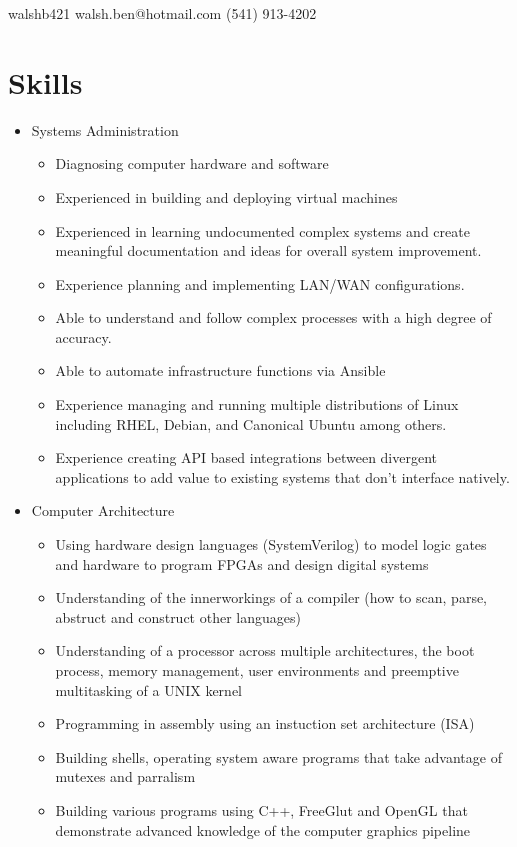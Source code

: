 \documentclass{article}
\begin{document}

	\vspace{0.5cm}

	\noindent
    \faGithub
	\hspace{0.15cm}
	walshb421
	\hfill
	\faEnvelope
	\hspace{0.15cm}
	walsh.ben@hotmail.com	
	\hfill
	\faPhone
	\hspace{0.15cm}
	(541) 913-4202
	
	\section*{Skills}
	\begin{itemize}
		\item Systems Administration
		\begin{itemize}
			\item Diagnosing computer hardware and software
			\item Experienced in building and deploying virtual machines
			\item Experienced in learning undocumented complex systems and create meaningful documentation and ideas for overall system improvement. 
			\item Experience planning and implementing LAN/WAN configurations. 
			\item Able to understand and follow complex processes with a high degree of accuracy.  
			\item Able to automate infrastructure functions via Ansible
			\item Experience managing and running multiple distributions of Linux including RHEL, Debian, and Canonical Ubuntu among others.
			\item Experience creating API based integrations between divergent applications to add value to existing systems that don't interface natively.
		\end{itemize}

		\item Computer Architecture
		\begin{itemize}
			\item Using hardware design languages (SystemVerilog) to model logic gates and hardware to program FPGAs and design digital systems
			\item Understanding of the innerworkings of a compiler (how to scan, parse, abstruct and construct other languages)
			\item Understanding of a processor across multiple architectures, the boot process, memory management, user environments and preemptive multitasking of a UNIX kernel
			\item Programming in assembly using an instuction set architecture (ISA)
			\item Building shells, operating system aware programs that take advantage of mutexes and parralism
			\item Building various programs using C++, FreeGlut and OpenGL that demonstrate advanced knowledge of the computer graphics pipeline
		\end{itemize}


\end{itemize}
\end{document}
